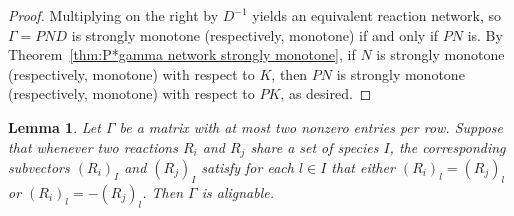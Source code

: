 \documentclass{article}
\newtheorem{lem}{Lemma}
\begin{document}
\begin{proof}
Multiplying on the right by \( D^{-1} \) yields an equivalent reaction network, so \( \Gamma = PND \) is strongly monotone (respectively, monotone) if and only if \( PN \) is. By Theorem~\ref{thm:P*gamma network strongly monotone}, if \( N \) is strongly monotone (respectively, monotone) with respect to \( K \), then \( PN \) is strongly monotone (respectively, monotone) with respect to \( PK \), as desired.
\end{proof}


\begin{lem}
\label{lem:cube type to aligned}
Let \( \Gamma \) be a matrix with at most two nonzero entries per row. Suppose that whenever two reactions \( R_i \) and \( R_j \) share a set of species \( I \), the corresponding subvectors \( (R_i)_I \) and \( (R_j)_I \) satisfy for each $l \in I$ that either \( (R_i)_l = (R_j)_l \) or \( (R_i)_l = - (R_j)_l \). Then \( \Gamma \) is alignable.
\end{lem}
\end{document}
